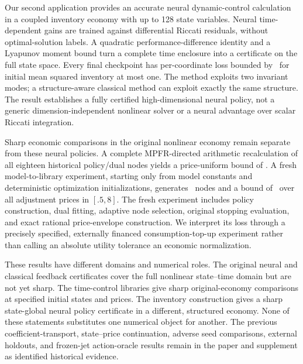 Our second application provides an accurate neural dynamic-control calculation in a coupled inventory economy with up to 128 state variables. Neural time-dependent gains are trained against differential Riccati residuals, without optimal-solution labels. A quadratic performance-difference identity and a Lyapunov moment bound turn a complete time enclosure into a certificate on the full state space. Every final checkpoint has per-coordinate loss bounded by \RInventoryFinalMax\ for initial mean squared inventory at most one. The method exploits two invariant modes; a structure-aware classical method can exploit exactly the same structure. The result establishes a fully certified high-dimensional neural policy, not a generic dimension-independent nonlinear solver or a neural advantage over scalar Riccati integration.

Sharp economic comparisons in the original nonlinear economy remain separate from these neural policies. A complete MPFR-directed arithmetic recalculation of all eighteen historical policy/dual nodes yields a price-uniform bound of \RMPFRGap. A fresh model-to-library experiment, starting only from model constants and deterministic optimization initializations, generates \RFreshNodes\ nodes and a bound of \RFreshGap\ over all adjustment prices in $[.5,8]$. The fresh experiment includes policy construction, dual fitting, adaptive node selection, original stopping evaluation, and exact rational price-envelope construction. We interpret its loss through a precisely specified, externally financed consumption-top-up experiment rather than calling an absolute utility tolerance an economic normalization.

These results have different domains and numerical roles. The original neural and classical feedback certificates cover the full nonlinear state--time domain but are not yet sharp. The time-control libraries give sharp original-economy comparisons at specified initial states and prices. The inventory construction gives a sharp state-global neural policy certificate in a different, structured economy. None of these statements substitutes one numerical object for another. The previous coefficient-transport, state--price continuation, adverse seed comparisons, external holdouts, and frozen-jet action-oracle results remain in the paper and supplement as identified historical evidence.

